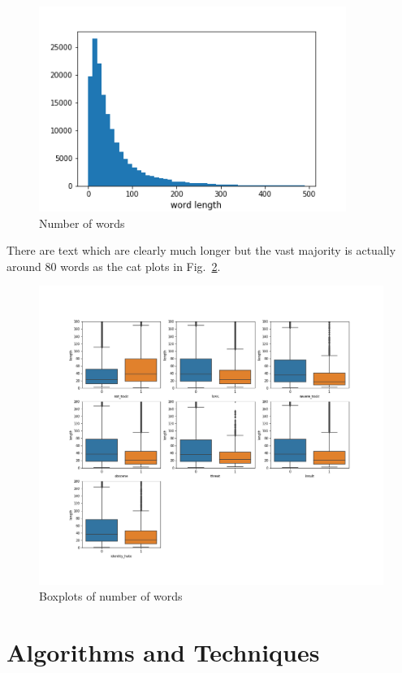 \documentclass{report}
\begin{document}
\begin{figure}[!h]
\centering
  \includegraphics[width=100mm]{../local/plots_tables/word_length_hist.png}
  \caption{Number of words}
  \label{fig:hist}
\end{figure}
There are text which are clearly much longer but the vast majority is actually around 80 words as the cat plots in Fig.~\ref{fig:catplots}.
\begin{figure}[!h]
\centering
  \includegraphics[width=170mm]{../local/plots_tables/catplots.png}
  \caption{Boxplots of number of words}
  \label{fig:catplots}
\end{figure}

\section{Algorithms and Techniques}
\end{document}
